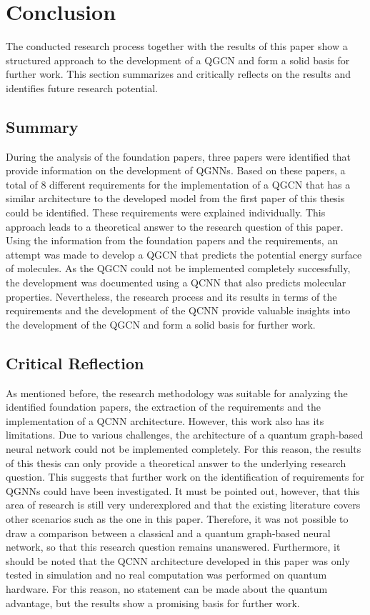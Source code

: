 \section{Conclusion}
The conducted research process together with the results of this paper show a structured approach to the development of a QGCN and form a solid basis for further work. This section summarizes and critically reflects on the results and identifies future research potential.

\subsection{Summary}
During the analysis of the foundation papers, three papers were identified that provide information on the development of QGNNs. Based on these papers, a total of 8 different requirements for the implementation of a QGCN that has a similar architecture to the developed model from the first paper of this thesis could be identified. These requirements were explained individually. This approach leads to a theoretical answer to the research question of this paper. Using the information from the foundation papers and the requirements, an attempt was made to develop a QGCN that predicts the potential energy surface of molecules. As the QGCN could not be implemented completely successfully, the development was documented using a QCNN that also predicts molecular properties. Nevertheless, the research process and its results in terms of the requirements and the development of the QCNN provide valuable insights into the development of the QGCN and form a solid basis for further work. 

\subsection{Critical Reflection}
As mentioned before, the research methodology was suitable for analyzing the identified foundation papers, the extraction of the requirements and the implementation of a QCNN architecture. However, this work also has its limitations. Due to various challenges, the architecture of a quantum graph-based neural network could not be implemented completely. For this reason, the results of this thesis can only provide a theoretical answer to the underlying research question. This suggests that further work on the identification of requirements for QGNNs could have been investigated. It must be pointed out, however, that this area of research is still very underexplored and that the existing literature covers other scenarios such as the one in this paper. Therefore, it was not possible to draw a comparison between a classical and a quantum graph-based neural network, so that this research question remains unanswered. Furthermore, it should be noted that the QCNN architecture developed in this paper was only tested in simulation and no real computation was performed on quantum hardware. For this reason, no statement can be made about the quantum advantage, but the results show a promising basis for further work.

